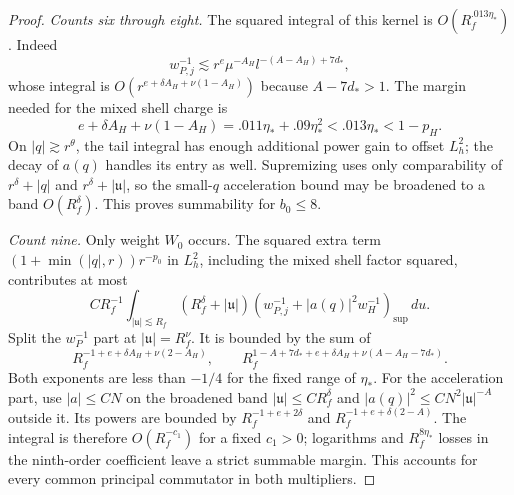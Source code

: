 \begin{proof}
\emph{Counts six through eight.} The squared integral of this kernel is
$O(R_f^{.013\eta_*})$.  Indeed
\[
 w_{P,j}^{-1}\lesssim
 r^e\mu^{-A_H}l^{-(A-A_H)+7d_*},
\]
whose integral is $O(r^{e+\delta A_H+\nu(1-A_H)})$ because
$A-7d_*>1$.  The margin needed for the mixed shell charge is
\begin{equation}\label{fs:principal-shell-margin}
 e+\delta A_H+\nu(1-A_H)
 =.011\eta_*+.09\eta_*^2<.013\eta_*<1-p_H.
\end{equation}
On $|q|\gtrsim r^\theta$, the tail integral has enough additional
power gain to offset $L_h^2$; the decay of $a(q)$ handles its entry
as well.  Supremizing uses only comparability of
$r^\delta+|q|$ and $r^\delta+|\mathfrak u|$, so the small-$q$
acceleration bound may be broadened to a band $O(R_f^\delta)$.
This proves summability for $b_0\le8$.

\emph{Count nine.} Only weight $W_0$ occurs.  The squared extra term
$(1+\min(|q|,r))r^{-p_0}$ in $L_h^2$, including the mixed shell
factor squared, contributes at most
\[
 C R_f^{-1}\int_{|\mathfrak u|\lesssim R_f}
 (R_f^\delta+|\mathfrak u|)
 (w_{P,j}^{-1}+|a(q)|^2w_H^{-1})_{\sup}\,du.
\]
Split the $w_P^{-1}$ part at $|\mathfrak u|=R_f^\nu$.  It is
bounded by the sum of
\[
 R_f^{-1+e+\delta A_H+\nu(2-A_H)},\qquad
 R_f^{1-A+7d_*+e+\delta A_H+\nu(A-A_H-7d_*)}.
\]
Both exponents are less than $-1/4$ for the fixed range of $\eta_*$.
For the acceleration part, use $|a|\le CN$ on the broadened band
$|\mathfrak u|\le C R_f^\delta$ and
$|a(q)|^2\le CN^2|\mathfrak u|^{-A}$ outside it.  Its powers are
bounded by
$R_f^{-1+e+2\delta}$ and $R_f^{-1+e+\delta(2-A)}$.
The integral is therefore $O(R_f^{-c_1})$ for a fixed $c_1>0$;
logarithms and $R_f^{8\eta_*}$ losses in the ninth-order coefficient
leave a strict summable margin.  This accounts for every common
principal commutator in both multipliers.


\end{proof}
